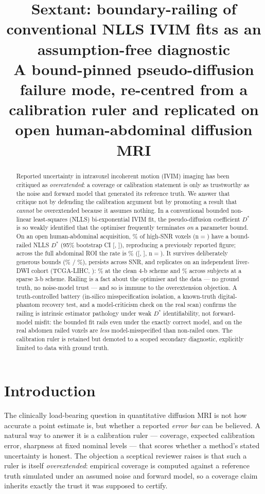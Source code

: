 \documentclass[11pt]{article}
\title{\textbf{Sextant: boundary-railing of conventional NLLS IVIM fits as an
assumption-free diagnostic}\\[2pt]
\large A bound-pinned pseudo-diffusion failure mode, re-centred from a calibration
ruler and replicated on open human-abdominal diffusion MRI}
\author{}
\date{}
\begin{document}
\maketitle

\begin{abstract}
\noindent
Reported uncertainty in intravoxel incoherent motion (IVIM) imaging has been
critiqued as \emph{overextended}: a coverage or calibration statement is only as
trustworthy as the noise and forward model that generated its reference truth. We
answer that critique not by defending the calibration argument but by promoting a
result that \emph{cannot} be overextended because it assumes nothing. In a
conventional bounded non-linear least-squares (NLLS) bi-exponential IVIM fit, the
pseudo-diffusion coefficient $D^{*}$ is so weakly identified that the optimiser
frequently terminates \emph{on} a parameter bound. On an open human-abdominal
acquisition, \HomoFrac\% of high-SNR voxels (n${=}$\HomoN) have a bound-railed NLLS
$D^{*}$ (95\% bootstrap CI [\HomoCIlo, \HomoCIhi]), reproducing a previously
reported figure; across the full abdominal ROI the rate is \FullFrac\%
([\FullCIlo, \FullCIhi], n${=}$\FullN). It survives deliberately generous bounds
(\HomoWide\% / \FullWide\%), persists across SNR, and replicates on an independent
liver-DWI cohort (TCGA-LIHC, \lihcLicense): \LihcFourFrac\% at the clean 4-b scheme
and \LihcThreeFrac\% across \LihcThreeSubj{} subjects at a sparse 3-b scheme.
Railing is a fact about the optimiser and the data --- no ground truth, no
noise-model trust --- and so is immune to the overextension objection. A
truth-controlled battery (in-silico misspecification isolation, a known-truth
digital-phantom recovery test, and a model-criticism check on the real scan)
confirms the railing is intrinsic estimator pathology under weak $D^{*}$
identifiability, not forward-model misfit: the bounded fit rails even under the
exactly correct model, and on the real abdomen railed voxels are \emph{less}
model-misspecified than non-railed ones. The calibration ruler is retained but
demoted to a scoped secondary diagnostic, explicitly limited to data with ground
truth.
\end{abstract}

\section{Introduction}
The clinically load-bearing question in quantitative diffusion MRI is not how
accurate a point estimate is, but whether a reported \emph{error bar} can be
believed. A natural way to answer it is a calibration ruler --- coverage, expected
calibration error, sharpness at fixed nominal levels --- that scores whether a
method's stated uncertainty is honest. The objection a sceptical reviewer raises
is that such a ruler is itself \emph{overextended}: empirical coverage is computed
against a reference truth simulated under an assumed noise and forward model, so a
coverage claim inherits exactly the trust it was supposed to certify.
\end{document}
